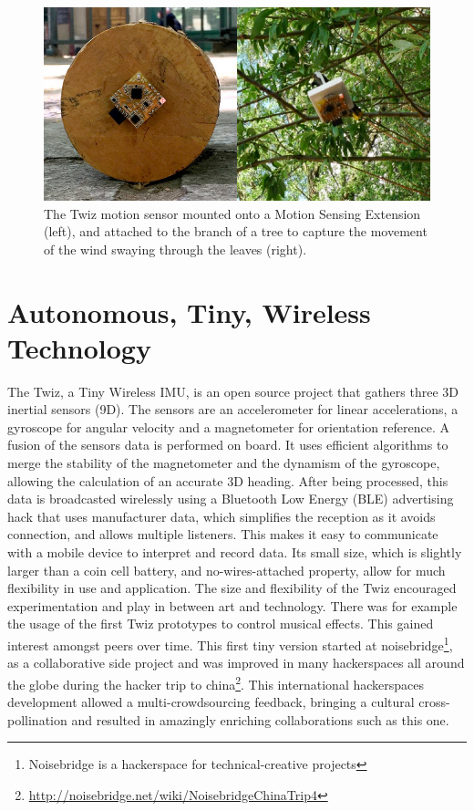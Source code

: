 \documentclass{sigchi}
\begin{document}
\begin{figure}[H]
\centering
\includegraphics[width=\columnwidth]{pics/fieldtrip}
\caption{The Twiz motion sensor mounted onto a Motion
Sensing Extension (left), and attached to the branch of
a tree to capture the movement of the wind swaying through
the leaves (right).}
\label{fig:fieldtrip}
\end{figure}

\section{Autonomous, Tiny, Wireless Technology}

The Twiz, a Tiny Wireless IMU, is an open source project
that gathers three 3D inertial sensors (9D). The
sensors are an accelerometer for linear accelerations,
a gyroscope for angular velocity and a magnetometer for
orientation reference. A fusion of the sensors data is
performed on board. It uses efficient algorithms to
merge the stability of the magnetometer and the
dynamism of the gyroscope, allowing the calculation of
an accurate 3D heading. After being processed, this
data is broadcasted wirelessly using a Bluetooth Low
Energy (BLE) advertising hack that uses manufacturer
data, which simplifies the reception as it avoids
connection, and allows multiple listeners. This makes it
easy to communicate with a mobile device to interpret
and record data. Its small size, which is slightly larger
than a coin cell battery, and no-wires-attached
property, allow for much flexibility in use and
application.
The size and flexibility of the Twiz encouraged
experimentation and play in between art and
technology. There was for example the usage of the
first Twiz prototypes to control musical effects. This
gained interest amongst peers over time. This first tiny
version started at noisebridge\footnote{Noisebridge is a
hackerspace for technical-creative projects}, as a collaborative
side project and was improved in many hackerspaces all
around the globe during the hacker trip to china\footnote
{\url{http://noisebridge.net/wiki/NoisebridgeChinaTrip4}}.
This international hackerspaces development allowed a
multi-crowdsourcing feedback, bringing a cultural
cross-pollination and resulted in amazingly enriching
collaborations such as this one.
\end{document}
